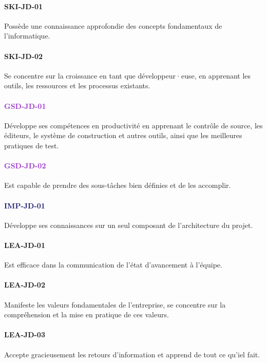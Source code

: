 \documentclass[a4paper, french, openany, 12pt]{book}
\newcommand\dex[1]{\textcolor{BrickRed}{\textbf{\uppercase{ski-{#1}}}}}
\newcommand\str[1]{\textcolor{DarkOrchid}{\textbf{\uppercase{gsd-{#1}}}}}
\newcommand\wis[1]{\textcolor{MidnightBlue}{\textbf{\uppercase{imp-{#1}}}}}
\newcommand\cha[1]{\textcolor{OliveGreen}{\textbf{\uppercase{lea-{#1}}}}}
\newcommand\dev{développeur·euse}
\begin{document}
\begin{multicols}{2}

  \paragraph{\dex{jd-01}} 

  Possède une connaissance approfondie des concepts fondamentaux de l'informatique.

  \paragraph{\dex{jd-02}} 

  Se concentre sur la croissance en tant que \dev, en apprenant les outils, les ressources et les processus 
  existants.

  \paragraph{\str{jd-01}}

  Développe ses compétences en productivité en apprenant le contrôle de source, les éditeurs, le système de construction 
  et autres outils, ainsi que les meilleures pratiques de test.

  \paragraph{\str{jd-02}}

  Est capable de prendre des sous-tâches bien définies et de les accomplir.

  \paragraph{\wis{jd-01}}

  Développe ses connaissances sur un seul composant de l'architecture du projet.

  \paragraph{\cha{jd-01}}

  Est efficace dans la communication de l'état d'avancement à l'équipe.

  \paragraph{\cha{jd-02}}

  Manifeste les valeurs fondamentales de l'entreprise, se concentre sur la compréhension et la mise en pratique de ces 
  valeurs.

  \paragraph{\cha{jd-03}}

  Accepte gracieusement les retours d'information et apprend de tout ce qu'iel fait.
\end{multicols}
\end{document}
